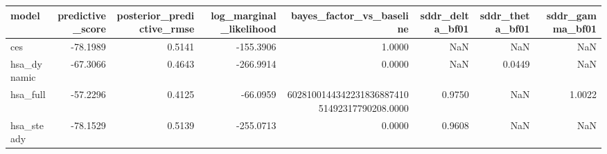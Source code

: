 \begin{tabular}{lrrrrrrr}
\toprule
model & predictive\_score & posterior\_predictive\_rmse & log\_marginal\_likelihood & bayes\_factor\_vs\_baseline & sddr\_delta\_bf01 & sddr\_theta\_bf01 & sddr\_gamma\_bf01 \\
\midrule
ces & -78.1989 & 0.5141 & -155.3906 & 1.0000 & NaN & NaN & NaN \\
hsa\_dynamic & -67.3066 & 0.4643 & -266.9914 & 0.0000 & NaN & 0.0449 & NaN \\
hsa\_full & -57.2296 & 0.4125 & -66.0959 & 602810014434223183688741051492317790208.0000 & 0.9750 & NaN & 1.0022 \\
hsa\_steady & -78.1529 & 0.5139 & -255.0713 & 0.0000 & 0.9608 & NaN & NaN \\
\bottomrule
\end{tabular}
